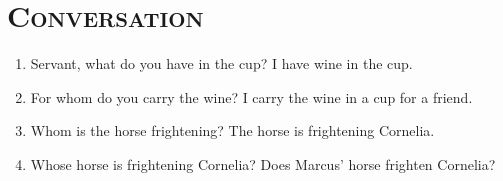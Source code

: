 \documentclass[12pt]{article}
\begin{document}
\section{\textsc{Conversation}}
\begin{enumerate}[1.]
	\item Servant, what do you have in the cup? I have wine in the cup.
	\item For whom do you carry the wine? I carry the wine in a cup for a friend.
	\item Whom is the horse frightening? The horse is frightening Cornelia.
	\item Whose horse is frightening Cornelia? Does Marcus' horse frighten Cornelia?
\end{enumerate}
\end{document}
